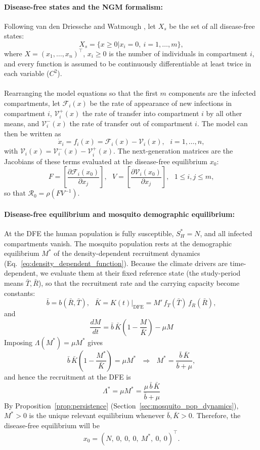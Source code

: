 \documentclass[a4paper,fleqn]{cas-dc}
\begin{document}
\paragraph{Disease-free states and the NGM formalism:}
\label{app:ngm_formalism}
Following van den Driessche and Watmough \cite{Rep_Number_Comp_Model},
let $X_s$ be the set of all disease-free states:
$$X_s = \{x \geq 0 | x_i = 0,\ i = 1, \ldots, m\},$$
where $X = (x_1, \ldots, x_n)^\top$, $x_i \geq 0$ is the number of
individuals in compartment $i$, and every function is assumed to be
continuously differentiable at least twice in each variable ($C^2$).
\\\\
Rearranging the model equations so that the first $m$ components are the
infected compartments, let $\mathcal{F}_i(x)$ be the rate of appearance
of new infections in compartment $i$, $\mathcal{V}_i^+(x)$ the rate of
transfer into compartment $i$ by all other means, and
$\mathcal{V}_i^-(x)$ the rate of transfer out of compartment $i$. The
model can then be written as
$$\dot{x}_i = f_i(x) = \mathcal{F}_i(x) - \mathcal{V}_i(x),
\ \ \ i = 1, \ldots, n,$$
with $\mathcal{V}_i(x) = \mathcal{V}_i^-(x) - \mathcal{V}_i^+(x)$. The
next-generation matrices are the Jacobians of these terms evaluated at
the disease-free equilibrium $x_0$:
$$F = \left[\frac{\partial \mathcal{F}_i(x_0)}{\partial x_j}\right],
\ \ \ V = \left[\frac{\partial \mathcal{V}_i(x_0)}{\partial x_j}\right],
\ \ \ 1 \leq i, j \leq m,$$
so that $\mathcal{R}_0 = \rho(FV^{-1})$.

\paragraph{Disease-free equilibrium and mosquito demographic equilibrium:}
\label{app:dfe}
At the DFE the human population is fully susceptible, $S_H^* = N$, and
all infected compartments vanish. The mosquito population rests at the
demographic equilibrium $M^*$ of the density-dependent recruitment
dynamics (Eq.~\ref{eq:density_dependent_function}). Because the climate drivers are time-dependent, we
evaluate them at their fixed reference state (the study-period means
$\bar{T}, \bar{R}$), so that the recruitment rate and the carrying
capacity become constants:
$$
\bar{b} = b(\bar{R}, \bar{T}), \ \ \ 
\bar{K} = K(t)\big|_{\mathrm{DFE}} = M'\, f_T(\bar{T})\, f_R(\bar{R}),
$$
and
$$
\frac{dM}{dt} = \bar{b}\,\bar{K}\left(1 - \frac{M}{\bar{K}}\right) - \mu M
$$
Imposing $\Lambda(M^*) = \mu M^*$ gives
$$
\bar{b}\,\bar{K}\left(1 - \frac{M^*}{\bar{K}}\right) = \mu M^*
\ \ \ \Longrightarrow \ \ \ 
M^* = \frac{\bar{b}\,\bar{K}}{\bar{b} + \mu},
$$
and hence the recruitment at the DFE is
$$
\Lambda^* = \mu M^* = \frac{\mu\,\bar{b}\,\bar{K}}{\bar{b} + \mu}
$$
By Proposition~\ref{prop:persistence} (Section~\ref{sec:mosquito_pop_dynamics}), $M^* > 0$
is the unique relevant equilibrium whenever $\bar{b}, \bar{K} > 0$.
Therefore, the disease-free equilibrium will be
\begin{equation}\label{eq:dfe}
x_0 = \left(N,\ 0,\ 0,\ 0,\ M^*,\ 0,\ 0\right)^\top.
\end{equation}
\end{document}
